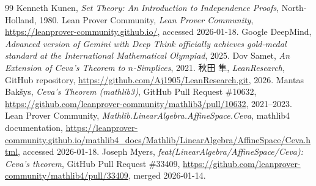 \documentclass[a4paper,12pt]{bxjsbook}
\theoremstyle{theorem}
\begin{document}
    \begin{thebibliography}{99}
         Kenneth Kunen, \emph{Set Theory: An Introduction to Independence Proofs}, North-Holland, 1980.
         Lean Prover Community, \emph{Lean Prover Community}, \url{https://leanprover-community.github.io/}, accessed 2026-01-18.
         Google DeepMind, \emph{Advanced version of Gemini with Deep Think officially achieves gold-medal standard at the International Mathematical Olympiad}, 2025.
         Dov Samet, \emph{An Extension of Ceva's Theorem to $n$-Simplices}, 2021.
         秋田 隼, \emph{LeanResearch}, GitHub repository, \url{https://github.com/Aj1905/LeanResearch.git}, 2026.
         Mantas Bak\v{s}ys, \emph{Ceva's Theorem (mathlib3)}, GitHub Pull Request \#10632, \url{https://github.com/leanprover-community/mathlib3/pull/10632}, 2021--2023.
         Lean Prover Community, \emph{Mathlib.LinearAlgebra.AffineSpace.Ceva}, mathlib4 documentation, \url{https://leanprover-community.github.io/mathlib4_docs/Mathlib/LinearAlgebra/AffineSpace/Ceva.html}, accessed 2026-01-18.
         Joseph Myers, \emph{feat(LinearAlgebra/AffineSpace/Ceva): Ceva's theorem}, GitHub Pull Request \#33409, \url{https://github.com/leanprover-community/mathlib4/pull/33409}, merged 2026-01-14.
    \end{thebibliography}
\end{document}

